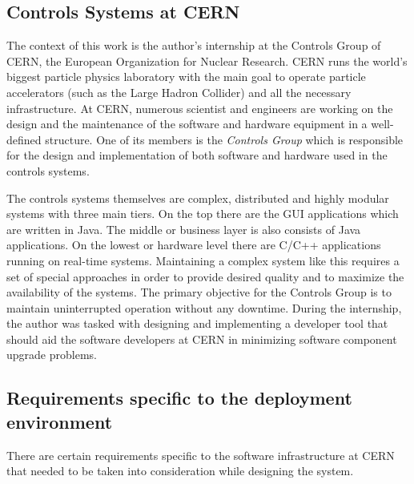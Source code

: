 \subsection{Controls Systems at CERN}
The context of this work is the author's internship at the Controls Group of
CERN, the European Organization for Nuclear Research. CERN runs the world's
biggest particle physics laboratory with the main goal to operate particle
accelerators (such as the Large Hadron Collider) and all the necessary
infrastructure. At CERN, numerous scientist and engineers are working on the
design and the maintenance of the software and hardware equipment in a
well-defined structure. One of its members is the \emph{Controls Group} which is
responsible for the design and implementation of both software and hardware used
in the controls systems.

The controls systems themselves are complex, distributed and highly modular systems
with three main tiers. On the top there are the GUI applications which are
written in Java. The middle or business layer is also consists of Java
applications. On the lowest or hardware level there are C/C++ applications
running on real-time systems. Maintaining a complex system like this requires a
set of special approaches in order to provide desired quality and to maximize
the availability of the systems. The primary objective for the Controls Group is
to maintain uninterrupted operation without any downtime. During the internship,
the author was tasked with designing and implementing a developer tool that
should aid the software developers at CERN in minimizing software component
upgrade problems.

\subsection{Requirements specific to the deployment environment}
There are certain requirements specific to the software infrastructure at CERN
that needed to be taken into consideration while designing the system.

